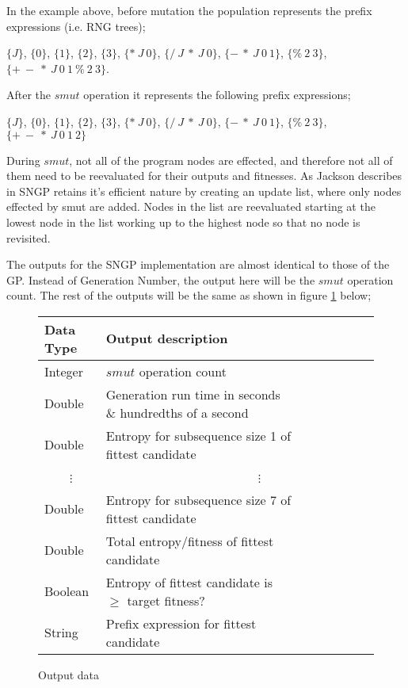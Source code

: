 \documentclass[a4paper,10.5pt]{article}
\begin{document}
In the example above, before mutation the population represents the prefix expressions (i.e. RNG trees);

\begin{center}
$\{J\}$, 
$\{0\}$, 
$\{1\}$, 
$\{2\}$, 
$\{3\}$, 
$\{* \ J \ 0\}$,
$\{/ \ J\ *\ J\ 0\}$, 
$\{-\ *\ J \ 0 \ 1\}$, 
$\{\%\ 2\ 3\}$,
$\{+\ -\ *\ J \ 0 \ 1 \ \%\ 2 \ 3\}$.
\end{center}
After the $smut$ operation it represents the following prefix expressions; \begin{center}$\{J\}$, $\{0\}$, $\{1\}$, $\{2\}$, $\{3\}$, $\{* \ J \ 0\}$, $\{/ \ J\ *\ J\ 0\}$, $\{-\ *\ J \ 0 \ 1\}$, $\{\%\ 2\ 3\}$, $\{+\ -\ *\ J \ 0 \ 1 \ 2\}$\end{center}

During $smut$, not all of the program nodes are effected, and therefore not all of them need to be reevaluated for their outputs and fitnesses. As Jackson describes in \cite[p.53]{jacksonsngp} SNGP retains it's efficient nature by creating an update list, where only nodes effected by smut are added. Nodes in the list are reevaluated starting at the lowest node in the list working up to the highest node so that no node is revisited.

The outputs for the SNGP implementation are almost identical to those of the GP. Instead of Generation Number, the output here will be the $smut$ operation count. The rest of the outputs will be the same as shown in figure \ref{outputparamsngp} below;

\begin{figure}[H]
\centering
\caption{Output data}
\label{outputparamsngp}
\begin{tabular}{l*{6}{l}r}
Data Type             & Output description\\
\hline
Integer & $smut$ operation count\\
Double & Generation run time in seconds \& hundredths of a second \\
Double & Entropy for subsequence size 1 of fittest candidate\\
\ \ \ \ $\vdots$ & \ \ \ \ \ \ \ \ \ \ \ \ \ \ \ \ \ \ \ \ \ \ \ \ $\vdots$\\
Double & Entropy for subsequence size 7 of fittest candidate\\
Double & Total entropy/fitness of fittest candidate\\
Boolean & Entropy of fittest candidate is $\geq$ target fitness?\\
String & Prefix expression for fittest candidate
\end{tabular}
\end{figure}
\end{document}
